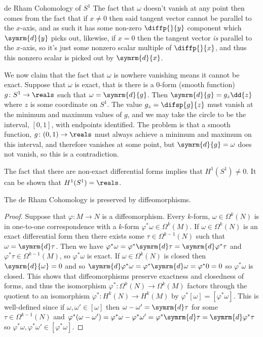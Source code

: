 \documentclass[fleqn]{NotesClass}
\renewcommand{\dl}{\symrm{d}}
\begin{document}
\begin{exm}{de Rham Cohomology of \(S^1\)}{}
        The fact that \(\omega\) doesn't vanish at any point then comes from the fact that if \(x \ne 0\) then said tangent vector cannot be parallel to the \(x\)-axis, and as such it has some non-zero \(\diffp{}{y}\) component which \(\dl{y}\) picks out, likewise, if \(x = 0\) then the tangent vector \emph{is} parallel to the \(x\)-axis, so it's just some nonzero scalar multiple of \(\diffp{}{x}\), and thus this nonzero scalar is picked out by \(\dl{x}\).
        
        We now claim that the fact that \(\omega\) is nowhere vanishing means it cannot be exact.
        Suppose that \(\omega\) is exact, that is there is a 0-form (smooth function) \(g \colon S^1 \to \reals\) such that \(\omega = \dl{g}\).
        Then \(\dl{g} = g_z \dd{z}\) where \(z\) is some coordinate on \(S^1\).
        The value \(g_z = \difsp{g}{z}\) must vanish at the minimum and maximum values of \(g\), and we may take the circle to be the interval, \([0, 1]\), with endpoints identified.
        The problem is that a smooth function, \(g \colon (0, 1) \to \reals\) must always achieve a minimum and maximum on this interval, and therefore vanishes at some point, but \(\dl{g} = \omega\) does not vanish, so this is a contradiction.
        
        The fact that there are non-exact differential forms implies that \(H^1(S^1) \ne 0\).
        It can be shown that \(H^1(S^1) = \reals\).
    \end{exm}
    
    \begin{lma}{}{}
        The de Rham Cohomology is preserved by diffeomorphisms.
        \begin{proof}
            Suppose that \(\varphi \colon M \to N\) is a diffeomorphism.
            Every \(k\)-form, \(\omega \in \Omega^k(N)\) is in one-to-one correspondence with a \(k\)-form \(\varphi^*\omega \in \Omega^k(M)\).
            If \(\omega \in \Omega^k(N)\) is an exact differential form then there exists some \(\tau \in \Omega^{k-1}(N)\) such that \(\omega = \dl \tau\).
            Then we have \(\varphi^* \omega = \varphi^* \dl \tau = \dl \varphi^* \tau\) and \(\varphi^* \tau \in \Omega^{k-1}(M)\), so \(\varphi^*\omega\) is exact.
            If \(\omega \in \Omega^k(N)\) is closed then \(\dl{\omega} = 0\) and so \(\dl \varphi^* \omega = \varphi^* \dl \omega = \varphi^* 0 = 0\) so \(\varphi^* \omega\) is closed.
            This shows that diffeomorphisms preserve exactness and closedness of forms, and thus the isomorphism \(\varphi^* \colon \Omega^k(N) \to \Omega^k(M)\) factors through the quotient to an isomorphism \(\varphi^* \colon H^k(N) \to H^k(M)\) by \(\varphi^*[\omega] = [\varphi^*\omega]\).
            This is well-defined since if \(\omega, \omega' \in [\omega]\) then \(\omega - \omega' = \dl \tau\) for some \(\tau \in \Omega^{k-1}(N)\) and \(\varphi^*(\omega - \omega') = \varphi^*\omega - \varphi^*\omega' = \varphi^*\dl \tau = \dl \varphi^*\tau\) so \(\varphi^*\omega, \varphi^*\omega' \in [\varphi^*\omega]\).
        \end{proof}
    \end{lma}
    
\end{document}
